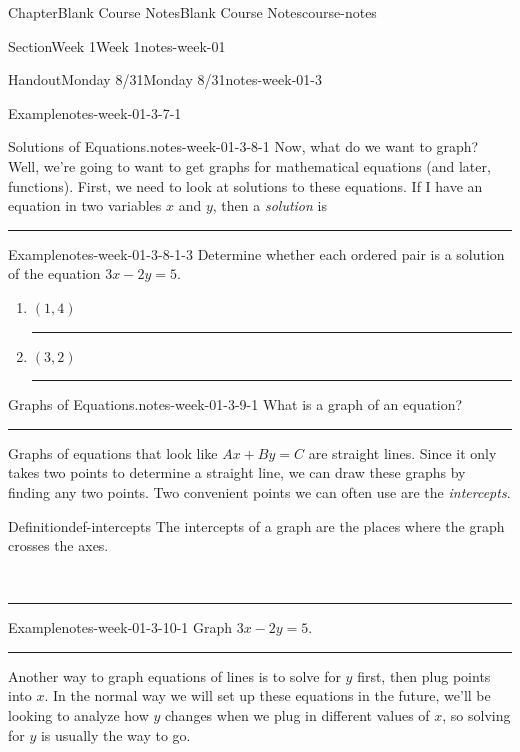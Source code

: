 \documentclass[twoside,14pt,]{extbook}
\newlength{\ptxworkspacestrutwidth}
\begin{document}
\begin{chapterptx}{Chapter}{Blank Course Notes}{}{Blank Course Notes}{}{}{course-notes}
\begin{sectionptx}{Section}{Week 1}{}{Week 1}{}{}{notes-week-01}
\begin{handout-subsection}{Handout}{Monday 8\slash{}31}{}{Monday 8\slash{}31}{}{}{notes-week-01-3}
\begin{example}{Example}{}{notes-week-01-3-7-1}
\end{example}
\clearpage
\begin{paragraphs}{Solutions of Equations.}{notes-week-01-3-8-1}%
Now, what do we want to graph? Well, we're going to want to get graphs for mathematical equations (and later, functions). First, we need to look at solutions to these equations. If I have an equation in two variables \(x\) and \(y\), then a \emph{solution} is%
\par\rule{\ptxworkspacestrutwidth}{1in}%
\begin{example}{Example}{}{notes-week-01-3-8-1-3}%
Determine whether each ordered pair is a solution of the equation \(3x - 2y = 5\).%
\begin{enumerate}[font=\bfseries,label=(\alph*),ref=\alph*]%
\item{}\((1, 4)\)%
\par\rule{\ptxworkspacestrutwidth}{2in}%
\item{}\((3,2)\)%
\par\rule{\ptxworkspacestrutwidth}{2in}%
\end{enumerate}%
\end{example}
\end{paragraphs}%
\clearpage
\begin{paragraphs}{Graphs of Equations.}{notes-week-01-3-9-1}%
What is a graph of an equation?%
\par\rule{\ptxworkspacestrutwidth}{3in}%
\par
Graphs of equations that look like \(Ax+By = C\) are straight lines. Since it only takes two points to determine a straight line, we can draw these graphs by finding any two points. Two convenient points we can often use are the \emph{intercepts}.%
\begin{definition}{Definition}{}{def-intercepts}%
The intercepts of a graph are the places where the graph crosses the axes.%
\par
~%
\par\rule{\ptxworkspacestrutwidth}{3in}%
\end{definition}
\end{paragraphs}%
\clearpage
\begin{example}{Example}{}{notes-week-01-3-10-1}%
Graph \(3x - 2y = 5\).%
\par\rule{\ptxworkspacestrutwidth}{3in}%
\end{example}
\clearpage
Another way to graph equations of lines is to solve for \(y\) first, then plug points into \(x\). In the normal way we will set up these equations in the future, we'll be looking to analyze how \(y\) changes when we plug in different values of \(x\), so solving for \(y\) is usually the way to go.%

\end{handout-subsection}
\end{sectionptx}
\end{chapterptx}
\end{document}
